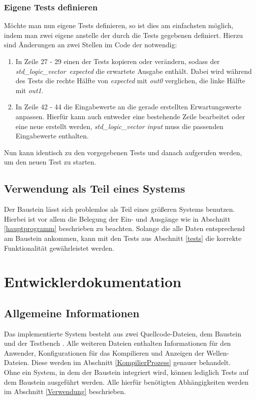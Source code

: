 \documentclass[a4paper]{article}
\begin{document}
   		\subsubsection{Eigene Tests definieren}
			   Möchte man nun eigene Tests definieren, so ist dies am einfachsten möglich, indem man zwei eigene  anstelle der durch die Tests gegebenen definiert. 
			   Hierzu sind Änderungen an zwei Stellen im Code der  notwendig:
   			\begin{enumerate}
				   \item In Zeile 27 - 29 einen der Tests kopieren oder verändern, sodass der \mbox{\emph{std_logic_vector expected}} die erwartete Ausgabe enthält. 
				   Dabei wird während des Tests die rechte Hälfte von \emph{expected} mit \emph{out0} verglichen, die linke Hälfte mit \emph{out1}.
				   \item In Zeile 42 - 44 die Eingabewerte an die gerade erstellten Erwartungswerte anpassen. 
				   Hierfür kann auch entweder eine bestehende Zeile bearbeitet oder eine neue erstellt werden, \emph{std_logic_vector input} muss die passenden Eingabewerte enthalten.
   			\end{enumerate}
   		
   			\noindent Nun kann identisch zu den vorgegebenen Tests  und danach  aufgerufen werden, um den neuen Test zu starten.
   			
   		\subsection{Verwendung als Teil eines Systems}
		   Der Baustein lässt sich problemlos als Teil eines größeren Systems benutzen. Hierbei ist vor allem die Belegung der Ein- und Ausgänge wie in Abschnitt \ref{hauptprogramm} beschrieben zu beachten.
		    Solange die alle Daten entsprechend am Baustein ankommen, kann mit den Tests aus Abschnitt \ref{tests} die korrekte Funktionalität gewährleistet werden.
            
    \section{Entwicklerdokumentation}
		\subsection{Allgemeine Informationen}
			Das implementierte System besteht aus zwei Quellcode-Dateien, dem Baustein  und der Testbench . 
			Alle weiteren Dateien enthalten Informationen für den Anwender, Konfigurationen für das Kompilieren und Anzeigen der Wellen-Dateien. Diese werden im Abschnitt \ref{KompilierProzess} genauer behandelt.\\
			Ohne ein System, in dem der Baustein integriert wird, können lediglich Tests auf dem Baustein ausgeführt werden. 
			Alle hierfür benötigten Abhängigkeiten werden im Abschnitt \ref{Verwendung} beschrieben.
\end{document}
